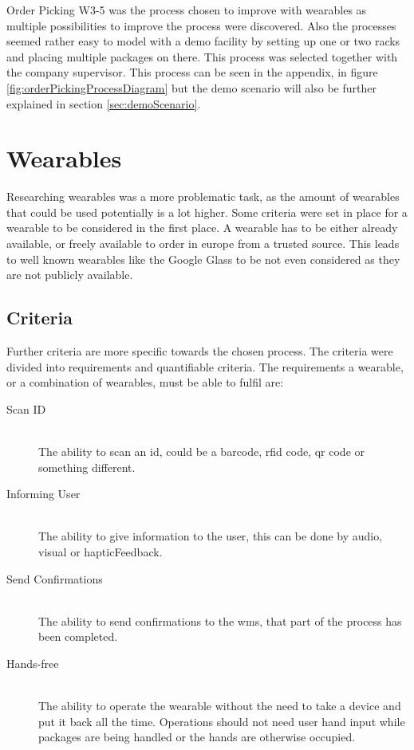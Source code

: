 Order Picking W3-5 was the process chosen to improve with wearables as multiple possibilities to improve the process were discovered. Also the processes seemed rather easy to model with a demo facility by setting up one or two racks and placing multiple packages on there. This process was selected together with the company supervisor. This process can be seen in the appendix, in figure \ref{fig:orderPickingProcessDiagram} but the demo scenario will also be further explained in section \ref{sec:demoScenario}.

\section{Wearables}\label{sec:wearables}
Researching wearables was a more problematic task, as the amount of wearables that could be used potentially is a lot higher. Some criteria were set in place for a wearable to be considered in the first place. A wearable has to be either already available, or freely available to order in europe from a trusted source. This leads to well known wearables like the Google Glass to be not even considered as they are not publicly available.

\subsection{Criteria}

Further criteria are more specific towards the chosen process. The criteria were divided into requirements and quantifiable criteria. The requirements a wearable, or a combination of wearables, must be able to fulfil are:
\begin{description}
	\item[Scan ID] \hfill \\
		The ability to scan an \gls{id}, could be a barcode, \gls{rfid} code, \gls{qr} code or something different.
	\item[Informing User] \hfill \\
		The ability to give information to the user, this can be done by audio, visual or \gls{hapticFeedback}. 
	\item[Send Confirmations] \hfill \\
		The ability to send confirmations to the \gls{wms}, that part of the process has been completed.
	\item[Hands-free] \hfill \\
		The ability to operate the wearable without the need to take a device and put it back all the time. Operations should not need user hand input while packages are being handled or the hands are otherwise occupied.
\end{description}

